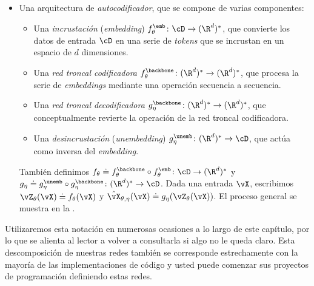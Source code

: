 \documentclass[../../book-main_es.tex]{subfiles}
\begin{document}
\begin{itemize}
\begin{itemize}
        \end{itemize}
        También definimos \(f_{\theta} \doteq f_{\theta}^{\backbone}
        \circ f_{\theta}^{\emb} \colon \cD \to (\R^{d})^{*}\). Dada
        una entrada \(\vX\), escribimos \(\vZ_{\theta}(\vX) \doteq
        f_{\theta}(\vX)\) y \(\vz_{\theta}(\vX) \doteq
        f_{\theta}^{\ext}(\vZ_{\theta}(\vX))\). El \textit{pipeline}
        se muestra en la .
    \item Una arquitectura de \textit{autocodificador}, que se compone de
        varias componentes:
        \begin{itemize}
            \item Una \textit{incrustación} (\textit{embedding}) \(f_{\theta}^{\emb} \colon
                \cD \to (\R^{d})^{*}\), que convierte los datos de entrada
                \(\cD\) en una serie de \textit{tokens} que se
                incrustan en un espacio de \(d\) dimensiones.
            \item Una \textit{red troncal codificadora}
                \(f_{\theta}^{\backbone} \colon (\R^{d})^{*} \to
                (\R^{d})^{*}\), que procesa la serie de
                \textit{embeddings} mediante una operación secuencia a secuencia.
            \item Una \textit{red troncal decodificadora} \(g_{\eta}^{\backbone}
                \colon (\R^{d})^{*} \to (\R^{d})^{*}\), que
                conceptualmente revierte la operación de la red troncal codificadora.
            \item Una \textit{desincrustación} (\textit{unembedding}) \(g_{\eta}^{\unemb} \colon
                (\R^{d})^{*} \to \cD\), que actúa como inversa del
                \textit{embedding}.
        \end{itemize}
        También definimos \(f_{\theta} \doteq f_{\theta}^{\backbone}
        \circ f_{\theta}^{\emb} \colon \cD \to (\R^{d})^{*}\) y
        \(g_{\eta} \doteq g_{\eta}^{\unemb} \circ
        g_{\eta}^{\backbone} \colon (\R^{d})^{*} \to \cD\). Dada una
        entrada \(\vX\), escribimos \(\vZ_{\theta}(\vX) \doteq
        f_{\theta}(\vX)\) y \(\hat{\vX}_{\theta, \eta}(\vX) \doteq
        g_{\eta}(\vZ_{\theta}(\vX))\). El proceso general se
        muestra en la .
\end{itemize}

Utilizaremos esta notación en numerosas ocasiones a lo largo de este capítulo, por lo que se alienta
al lector a volver a consultarla si algo no le queda claro.
Esta descomposición de nuestras redes también se corresponde estrechamente con la mayoría de las implementaciones de código
y usted puede comenzar sus proyectos de programación definiendo
estas redes.
\end{document}
